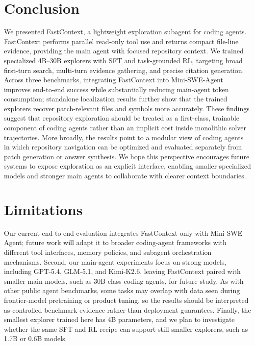 \documentclass[11pt]{article}
\newcommand{\approach}{{FastContext}\xspace}
\begin{document}
\section{Conclusion}
\vspace{-1.5mm}
We presented \approach, a lightweight exploration subagent for coding agents. \approach performs parallel read-only tool use and returns compact file-line evidence, providing the main agent with focused repository context.
We trained specialized 4B--30B explorers with SFT and task-grounded RL, targeting broad first-turn search, multi-turn evidence gathering, and precise citation generation. Across three benchmarks, integrating \approach into Mini-SWE-Agent improves end-to-end success while substantially reducing main-agent token consumption; standalone localization results further show that the trained explorers recover patch-relevant files and symbols more accurately. These findings suggest that repository exploration should be treated as a first-class, trainable component of coding agents rather than an implicit cost inside monolithic solver trajectories.
More broadly, the results point to a modular view of coding agents in which repository navigation can be optimized and evaluated separately from patch generation or answer synthesis.
We hope this perspective encourages future systems to expose exploration as an explicit interface, enabling smaller specialized models and stronger main agents to collaborate with clearer context boundaries.






\newpage
\section*{Limitations}
Our current end-to-end evaluation integrates \approach only with Mini-SWE-Agent; future work will adapt it to broader coding-agent frameworks with different tool interfaces, memory policies, and subagent orchestration mechanisms.
Second, our main-agent experiments focus on strong models, including GPT-5.4, GLM-5.1, and Kimi-K2.6, leaving \approach paired with smaller main models, such as 30B-class coding agents, for future study.
As with other public agent benchmarks, some tasks may overlap with data seen during frontier-model pretraining or product tuning, so the results should be interpreted as controlled benchmark evidence rather than deployment guarantees.
Finally, the smallest explorer trained here has 4B parameters, and we plan to investigate whether the same SFT and RL recipe can support still smaller explorers, such as 1.7B or 0.6B models.
\end{document}
